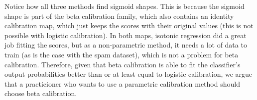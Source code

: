 \documentclass[oneside]{article}\usepackage[]{graphicx}\usepackage[]{color}
\begin{document}
\clearpage
Notice how all three methods find sigmoid shapes. This is because the sigmoid shape is part of the beta calibration family, which also contains an identity calibration map, which just keeps the scores with their original values (this is not possible with logistic calibration). In both maps, isotonic regression did a great job fitting the scores, but as a non-parametric method, it needs a lot of data to train (as is the case with the spam dataset), which is not a problem for beta calibration. Therefore, given that beta calibration is able to fit the classifier's output probabilities better than or at least equal to logistic calibration, we argue that a practicioner who wants to use a parametric calibration method should choose beta calibration.
\end{document}
